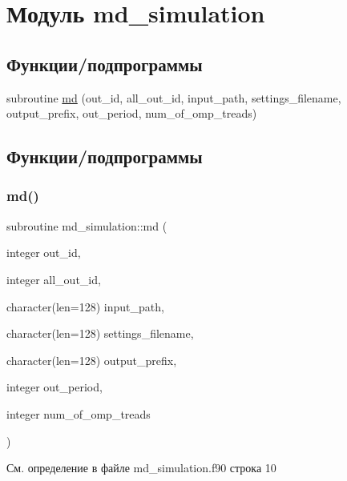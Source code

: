 \hypertarget{namespacemd__simulation}{}\section{Модуль md\+\_\+simulation}
\label{namespacemd__simulation}
\subsection*{Функции/подпрограммы}
\begin{DoxyCompactItemize}
\item 
subroutine \mbox{\hyperlink{namespacemd__simulation_ab2107f3ca598f6a748991632633ee760}{md}} (out\+\_\+id, all\+\_\+out\+\_\+id, input\+\_\+path, settings\+\_\+filename, output\+\_\+prefix, out\+\_\+period, num\+\_\+of\+\_\+omp\+\_\+treads)
\end{DoxyCompactItemize}


\subsection{Функции/подпрограммы}
\mbox{\label{namespacemd__simulation_ab2107f3ca598f6a748991632633ee760}} 
\subsubsection{\texorpdfstring{md()}{md()}}
{\footnotesize\ttfamily subroutine md\+\_\+simulation\+::md (\begin{DoxyParamCaption}\item[{integer}]{out\+\_\+id,  }\item[{integer}]{all\+\_\+out\+\_\+id,  }\item[{character(len=128)}]{input\+\_\+path,  }\item[{character(len=128)}]{settings\+\_\+filename,  }\item[{character(len=128)}]{output\+\_\+prefix,  }\item[{integer}]{out\+\_\+period,  }\item[{integer}]{num\+\_\+of\+\_\+omp\+\_\+treads }\end{DoxyParamCaption})}



См. определение в файле md\+\_\+simulation.\+f90 строка 10


